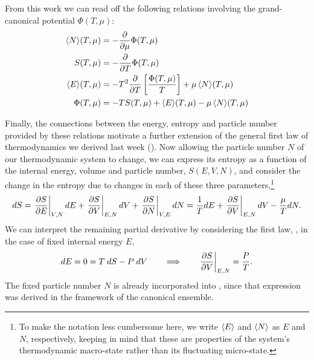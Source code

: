 \begin{shaded}
  From this work we can read off the following relations involving the grand-canonical potential $\Phi(T, \mu)$:
  \begin{align}
    \left\langle N \right\rangle\!(T, \mu) & = -\frac{\partial }{\partial \mu} \Phi(T, \mu) \\
            S(T, \mu) & = -\frac{\partial }{\partial T} \Phi(T, \mu) \\
    \left\langle E \right\rangle\!(T, \mu) & = -T^2 \frac{\partial }{\partial T} \left[\frac{\Phi(T, \mu)}{T}\right] + \mu \left\langle N \right\rangle\!(T, \mu) \label{eq:E_grand} \\
         \Phi(T, \mu) & = -T S(T, \mu) + \left\langle E \right\rangle\!(T, \mu) - \mu \left\langle N \right\rangle\!(T, \mu)
  \end{align}
\end{shaded}

Finally, the connections between the energy, entropy and particle number provided by these relations motivate a further extension of the general first law of thermodynamics we derived last week ().
Now allowing the particle number $N$ of our thermodynamic system to change, we can express its entropy as a function of the internal energy, volume and particle number, $S(E, V, N)$, and consider the change in the entropy due to changes in each of these three parameters,\footnote{To make the notation less cumbersome here, we write $\left\langle E \right\rangle$ and $\left\langle N \right\rangle$ as $E$ and $N$, respectively, keeping in mind that these are properties of the system's thermodynamic macro-state rather than its fluctuating micro-state.}
\begin{equation*}
  dS = \left.\frac{\partial S}{\partial E}\right|_{V, N} dE + \left.\frac{\partial S}{\partial V}\right|_{E, N} dV + \left.\frac{\partial S}{\partial N}\right|_{V, E} dN = \frac{1}{T} dE + \left.\frac{\partial S}{\partial V}\right|_{E, N} dV - \frac{\mu}{T} dN.
\end{equation*}
We can interpret the remaining partial derivative by considering the first law, , in the case of fixed internal energy $E$,
\begin{equation*}
  dE = 0 = T \; dS - P \; dV \qquad \Longrightarrow \qquad \left.\frac{\partial S}{\partial V}\right|_{E, N} = \frac{P}{T}.
\end{equation*}
The fixed particle number $N$ is already incorporated into , since that expression was derived in the framework of the canonical ensemble.

